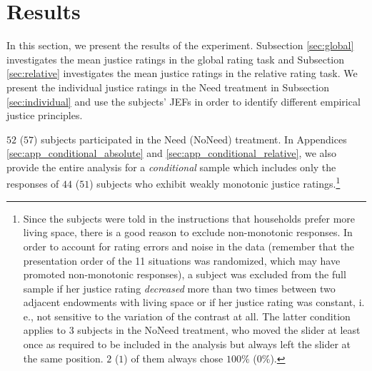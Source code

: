 \documentclass[12pt]{scrartcl}
\begin{document}
\section{Results}\label{sec:results}
In this section, we present the results of the experiment.
Subsection \ref{sec:global} investigates the mean justice ratings in the global rating task and Subsection \ref{sec:relative} investigates the mean justice ratings in the relative rating task.
We present the individual justice ratings in the Need treatment in Subsection \ref{sec:individual} and use the subjects' JEFs in order to identify different empirical justice principles.

$52$ ($57$) subjects participated in the Need (NoNeed) treatment.
In Appendices \ref{sec:app_conditional_absolute} and \ref{sec:app_conditional_relative}, we also provide the entire analysis for a \textit{conditional} sample which includes only the responses of $44$ ($51$) subjects who exhibit weakly monotonic justice ratings.\footnote{Since the subjects were told in the instructions that households prefer more living space, there is a good reason to exclude non-monotonic responses. In order to account for rating errors and noise in the data (remember that the presentation order of the 11 situations was randomized, which may have promoted non-monotonic responses), a subject was excluded from the full sample if her justice rating \textit{decreased} more than two times between two adjacent endowments with living space or if her justice rating was constant, i.\,e., not sensitive to the variation of the contrast at all. The latter condition applies to $3$ subjects in the NoNeed treatment, who moved the slider at least once as required to be included in the analysis but always left the slider at the same position. $2$ ($1$) of them always chose $100\%$ ($0\%$).}
\end{document}
